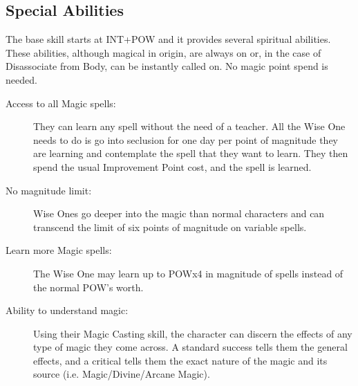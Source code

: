\subsection{Special Abilities}
The base skill starts at INT+POW and it provides several spiritual abilities. These abilities, although magical in origin, are always on or, in the case of Disassociate from Body, can be instantly called on. No magic point spend is needed.

\begin{description}
\item[Access to all Magic spells:] They can learn any spell without the need of a teacher. All the Wise One needs to do is go into seclusion for one day per point of magnitude they are learning and contemplate the spell that they want to learn. They then spend the usual Improvement Point cost, and the spell is learned.

\item[No magnitude limit:] Wise Ones go deeper into the magic than normal characters and can transcend the limit of six points of magnitude on variable spells.

\item[Learn more Magic spells:] The Wise One may learn up to POWx4 in magnitude of spells instead of the normal POW’s worth.

\item[Ability to understand magic:] Using their Magic Casting skill, the character can discern the effects of any type of magic they come across. A standard success tells them the general effects, and a critical tells them the exact nature of the magic and its source (i.e. Magic/Divine/Arcane Magic).


\end{description}
